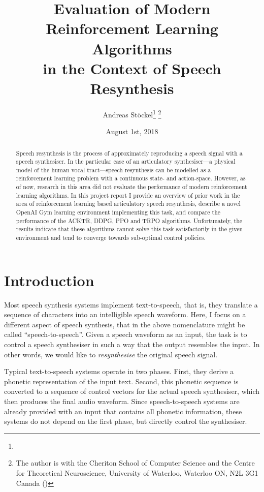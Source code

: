 \documentclass[letterpaper,10pt,conference]{ieeeconf}
\title{Evaluation of Modern Reinforcement Learning Algorithms\\in the Context of Speech Resynthesis}
\date{August 1st, 2018}
\author{Andreas Stöckel\thanks{}
  \thanks{The author is with the Cheriton School of Computer Science and the Centre for Theoretical Neuroscience, University of Waterloo, Waterloo ON, N2L 3G1 Canada (\you)}}
\begin{document}
\maketitle

\begin{abstract}
Speech resynthesis is the process of approximately reproducing a speech signal with a speech synthesiser. In the particular case of an articulatory synthesiser---a physical model of the human vocal tract---speech resynthesis can be modelled as a reinforcement learning problem with a continuous state- and action-space. However, as of now, research in this area did not evaluate the performance of modern reinforcement learning algorithms. In this project report I provide an overview of prior work in the area of reinforcement learning based articulatory speech resynthesis, describe a novel OpenAI Gym learning environment implementing this task, and compare the performance of the ACKTR, DDPG, PPO and TRPO algorithms. Unfortunately, the results indicate that these algorithms cannot solve this task satisfactorily in the given environment and tend to converge towards sub-optimal control policies.
\end{abstract}

\section{Introduction}
\label{sec:introduction}

Most speech synthesis systems implement text-to-speech, that is, they translate a sequence of characters into an intelligible speech waveform. Here, I focus on a different aspect of speech synthesis, that in the above nomenclature might be called \enquote{speech-to-speech}. Given a speech waveform as an input, the task is to control a speech synthesiser in such a way that the output resembles the input. In other words, we would like to \emph{resynthesise} the original speech signal.

Typical text-to-speech systems operate in two phases. First, they derive a phonetic representation of the input text. Second, this phonetic sequence is converted to a sequence of control vectors for the actual speech synthesiser, which then produces the final audio waveform. Since speech-to-speech systems are already provided with an input that contains all phonetic information, these systems do not depend on the first phase, but directly control the synthesiser.
\end{document}
